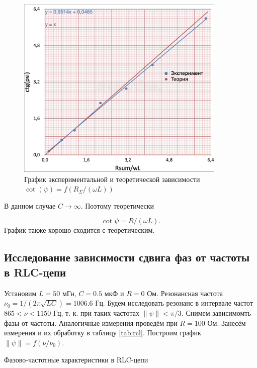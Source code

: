 \documentclass[12pt,a4paper]{article}
\begin{document}
    \begin{figure}[h!]
    	\centering
    	\includegraphics[width=10cm]{src/RL.png}
    	\caption{График экспериментальной и теоретической зависимости $\cot(\psi)=f\left( R_\Sigma/(\omega L) \right)$}
    	\label{fig:plRL}
    \end{figure}
    
    В данном случае $C \rightarrow \infty$. Поэтому теоретически 

    $$\cot \psi = R/(\omega L).$$
    График также хорошо сходится с теоретическим.



\subsection*{Исследование зависимости сдвига фаз от частоты в RLC-цепи}

Установим $L = 50$ мГн, $C = 0.5$ мкФ и $R = 0$ Ом. Резонансная частота $\nu_0 = 1/(2\pi \sqrt{LC}) = 1006.6$ Гц. Будем исследовать резонанс в интервале частот $865 < \nu < 1150$ Гц, т. к. при таких частотах $\|\psi \|<\pi/3$. Снимем зависимомть фазы от частоты. Аналогичные измерения проведём при $R = 100$ Ом. Занесём измерения и их обработку в таблицу \ref{tab:rcl}. Построим график $\|\psi\|=f \left( \nu/\nu_0 \right)$.

\begin{table}[H]
	\caption{Фазово-частотные характеристики в RLC-цепи}
	
	\label{tab:rcl}
\end{table}
\end{document}
